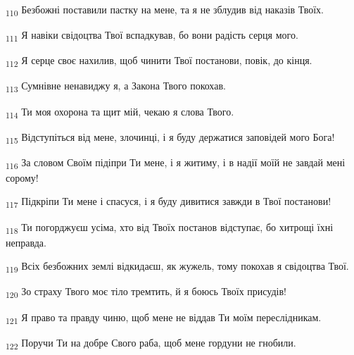 \begin{tcolorbox}
\textsubscript{110} Безбожні поставили пастку на мене, та я не зблудив від наказів Твоїх.
\end{tcolorbox}
\begin{tcolorbox}
\textsubscript{111} Я навіки свідоцтва Твої вспадкував, бо вони радість серця мого.
\end{tcolorbox}
\begin{tcolorbox}
\textsubscript{112} Я серце своє нахилив, щоб чинити Твої постанови, повік, до кінця.
\end{tcolorbox}
\begin{tcolorbox}
\textsubscript{113} Сумнівне ненавиджу я, а Закона Твого покохав.
\end{tcolorbox}
\begin{tcolorbox}
\textsubscript{114} Ти моя охорона та щит мій, чекаю я слова Твого.
\end{tcolorbox}
\begin{tcolorbox}
\textsubscript{115} Відступіться від мене, злочинці, і я буду держатися заповідей мого Бога!
\end{tcolorbox}
\begin{tcolorbox}
\textsubscript{116} За словом Своїм підіпри Ти мене, і я житиму, і в надії моїй не завдай мені сорому!
\end{tcolorbox}
\begin{tcolorbox}
\textsubscript{117} Підкріпи Ти мене і спасуся, і я буду дивитися завжди в Твої постанови!
\end{tcolorbox}
\begin{tcolorbox}
\textsubscript{118} Ти погорджуєш усіма, хто від Твоїх постанов відступає, бо хитрощі їхні неправда.
\end{tcolorbox}
\begin{tcolorbox}
\textsubscript{119} Всіх безбожних землі відкидаєш, як жужель, тому покохав я свідоцтва Твої.
\end{tcolorbox}
\begin{tcolorbox}
\textsubscript{120} Зо страху Твого моє тіло тремтить, й я боюсь Твоїх присудів!
\end{tcolorbox}
\begin{tcolorbox}
\textsubscript{121} Я право та правду чиню, щоб мене не віддав Ти моїм переслідникам.
\end{tcolorbox}
\begin{tcolorbox}
\textsubscript{122} Поручи Ти на добре Свого раба, щоб мене гордуни не гнобили.
\end{tcolorbox}
